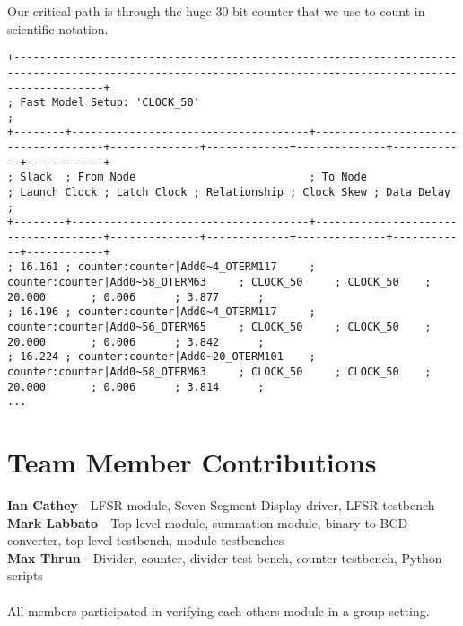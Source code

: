 \documentclass[12pt]{article}
\begin{document}
Our critical path is through the huge 30-bit counter that we use to count in scientific notation. 

\begin{verbatim}
+----------------------------------------------------------------------------------------------------------------------------------------------------------+
; Fast Model Setup: 'CLOCK_50'                                                                                                                             ;
+--------+-------------------------------------+-------------------------------------+--------------+-------------+--------------+------------+------------+
; Slack  ; From Node                           ; To Node                             ; Launch Clock ; Latch Clock ; Relationship ; Clock Skew ; Data Delay ;
+--------+-------------------------------------+-------------------------------------+--------------+-------------+--------------+------------+------------+
; 16.161 ; counter:counter|Add0~4_OTERM117     ; counter:counter|Add0~58_OTERM63     ; CLOCK_50     ; CLOCK_50    ; 20.000       ; 0.006      ; 3.877      ;
; 16.196 ; counter:counter|Add0~4_OTERM117     ; counter:counter|Add0~56_OTERM65     ; CLOCK_50     ; CLOCK_50    ; 20.000       ; 0.006      ; 3.842      ;
; 16.224 ; counter:counter|Add0~20_OTERM101    ; counter:counter|Add0~58_OTERM63     ; CLOCK_50     ; CLOCK_50    ; 20.000       ; 0.006      ; 3.814      ;
...
\end{verbatim}

\section*{Team Member Contributions}
\textbf{Ian Cathey} - LFSR module, Seven Segment Display driver, LFSR testbench \\
\textbf{Mark Labbato} - Top level module, summation module, binary-to-BCD converter, top level testbench, module testbenches \\
\textbf{Max Thrun} - Divider, counter, divider test bench, counter testbench, Python scripts\\
\\
All members participated in verifying each others module in a group setting.
\end{document}
